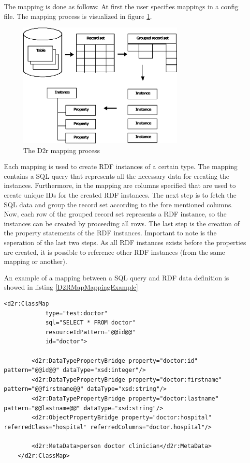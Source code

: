 The mapping is done as follows: At first the user specifies mappings in a config file. 
The mapping process is visualized in figure \ref{D2rMappingProcessFigure}.

\begin{figure}[H]
	\begin{center}
		\includegraphics[width=0.75\textwidth]{figures/MappingProcess.png}
	\end{center}
	\caption{The D2r mapping process \cite{D2rMap_aDatabaseToRdfMappingLanguage}}
	\label{D2rMappingProcessFigure}
\end{figure}

Each mapping is used to create RDF instances of a certain type. The mapping contains a SQL query that represents all the necessary data for creating the instances. Furthermore, in the mapping are columns specified that are used to create unique IDs for the created RDF instances.
The next step is to fetch the SQL data and group the record set according to the fore mentioned columns. Now, each row of the grouped record set represents a RDF instance, so the instances can be created by proceeding all rows. The last step is the creation of the property statements of the RDF instances. Important to note is the seperation of the last two steps. As all RDF instances exists before the properties are created, it is possible to reference other RDF instances (from the same mapping or another).

An example of a mapping between a SQL query and RDF data definition is showed in listing \ref{D2RMapMappingExample}

\begin{lstlisting}[style=RdfCodeStyle, caption=Example of a MeDSpace D2rMap mapping, label=D2RMapMappingExample]
<d2r:ClassMap
			type="test:doctor"
			sql="SELECT * FROM doctor"
			resourceIdPattern="@@id@@"
			id="doctor">

		<d2r:DataTypePropertyBridge property="doctor:id" pattern="@@id@@" dataType="xsd:integer"/>
		<d2r:DataTypePropertyBridge property="doctor:firstname" pattern="@@firstname@@" dataType="xsd:string"/>
		<d2r:DataTypePropertyBridge property="doctor:lastname" pattern="@@lastname@@" dataType="xsd:string"/>
		<d2r:ObjectPropertyBridge property="doctor:hospital" referredClass="hospital" referredColumns="doctor.hospital"/>

		<d2r:MetaData>person doctor clinician</d2r:MetaData>
	</d2r:ClassMap>

\end{lstlisting}

